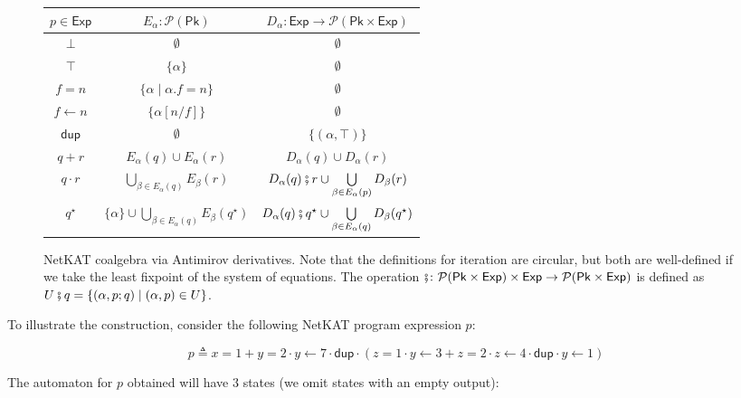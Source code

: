\documentclass[acmsmall,dvipsnames,nonacm]{acmart}
\newcommand\Pk{\mathsf{Pk}}
\newcommand\pk{\alpha}
\newcommand\pkp{\beta}
\newcommand\dup{\mathsf{dup}}
\newcommand\Exp{\mathsf{Exp}}
\newcommand\NetKAT{\textsf{NetKAT}\xspace}
\newcommand\pow[1]{\mathcal{P}(#1)}
\newcommand\zero{\bot}%
\newcommand\one{\top}%
\begin{document}
\begin{figure}



\begin{tabular}{|c|c|c|}
    \hline
    $p \in \Exp$        & $E_\pk \colon\pow\Pk$            & $D_\pk \colon \Exp\to\pow{\Pk \times \Exp}$ \\
    \hline
    $\zero$                   & $ \emptyset$                                          & $\emptyset$ \\
    $\one$                  &  $\{\pk\}$                                            & $\emptyset$ \\
    $f = n$             & $\{\pk\mid \pk.f = n\}$                         & $\emptyset$  \\
    $f \gets n$         & $\{\pk[n/f]\}$                     & $\emptyset$ \\
     $\dup$ &  $\emptyset$                                            & $\{(\pk, \one)\}$\\
    $q + r$             & $E_{\pk}(q) \cup E_{\pk}(r)$     & $D_{\pk}(q) \cup D_{\pk}(r)$\\
    $q \cdot r$         & $\bigcup\limits_{\pkp\in E_\pk(q)}  E_{\pkp}(r)$ & $D_{\pk}(q)\fatsemi r \cup \bigcup\limits_{\pkp\in E_{\pk}(p)} D_{\pkp}(r)$\\
    $q^\star$           & $\{\pk\} \cup \bigcup\limits_{\pkp\in E_\pk(q)}  E_{\pkp}(q^\star)$                    &  $D_{\pk}(q)\fatsemi q^\star \cup \bigcup\limits_{\pkp\in E_{\pk}(q)} D_{\pkp}(q^\star)$ \\
    \hline
\end{tabular}
    \caption{\NetKAT coalgebra via Antimirov derivatives. Note that the definitions for iteration are circular, but both are well-defined if we take the least fixpoint of the system of equations. The operation $\fatsemi \colon \pow{\Pk \times \Exp} \times \Exp \to \pow{\Pk \times \Exp}$ is defined as $U \fatsemi q = \{(\pk, p;q) \mid (\pk,p)\in U\}$. }
    \label{fig:derivatives}
\end{figure}


To illustrate the construction, consider the following \NetKAT program expression $p$:

\[
p \triangleq
    x=1 +  y=2\cdot y\gets7\cdot\dup\cdot(z=1\cdot y\gets3 +  z=2\cdot z\gets4\cdot\dup\cdot y\gets1)
\]

The automaton for $p$ obtained will have $3$ states (we omit states with an empty output):
\begin{center}
\end{center}
\end{document}
